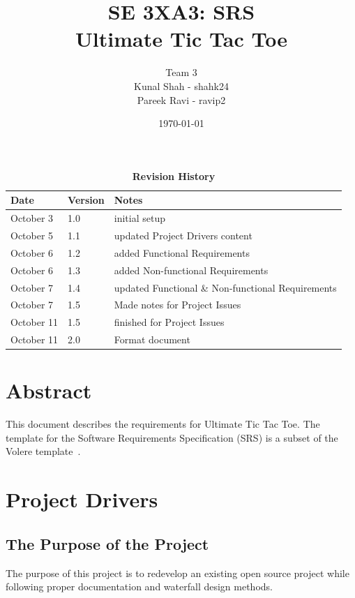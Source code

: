 \documentclass[12pt, titlepage]{article}
\title{SE 3XA3: SRS\\Ultimate Tic Tac Toe}
\author{Team 3
		\\ Kunal Shah - shahk24
		\\ Pareek Ravi - ravip2
}
\date{\today}
\begin{document}
\maketitle

\tableofcontents
\listoftables
\listoffigures

\begin{table}[bp]
\caption{\bf Revision History}
\begin{tabularx}{\textwidth}{p{3cm}p{2cm}X}
\toprule {\bf Date} & {\bf Version} & {\bf Notes}\\
\midrule
October 3 & 1.0 & initial setup\\
October 5 & 1.1 & updated Project Drivers content\\
October 6 & 1.2 & added Functional Requirements\\
October 6 & 1.3 & added Non-functional Requirements\\
October 7 & 1.4 & updated Functional \& Non-functional Requirements\\
October 7 & 1.5 & Made notes for Project Issues\\
October 11 & 1.5 & finished for Project Issues\\
October 11 & 2.0 & Format document\\
\bottomrule
\end{tabularx}
\end{table}

\newpage


\section*{Abstract}
This document describes the requirements for Ultimate Tic Tac Toe. The template 
for the Software Requirements Specification (SRS) is a subset of the Volere
template~\citep{RobertsonAndRobertson2012}.

\section{Project Drivers}

\subsection{The Purpose of the Project}
The purpose of this project is to redevelop an existing open source project
while following proper documentation and waterfall design methods.
\end{document}
